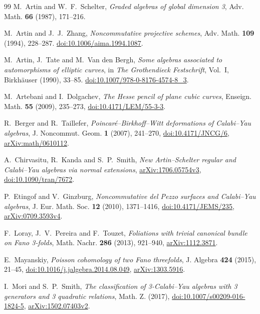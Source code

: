 \documentclass[11pt,a4paper]{ltjsarticle}
\numberwithin{equation}{section}
\begin{document}
\begin{thebibliography}{99}
M.~Artin and W.~F.~Schelter,
\textit{Graded algebras of global dimension 3},
Adv. Math. \textbf{66} (1987), 171--216.

M.~Artin and J.~J.~Zhang,
\textit{Noncommutative projective schemes},
Adv. Math. \textbf{109} (1994), 228--287.
\href{https://doi.org/10.1006/aima.1994.1087}{doi:10.1006/aima.1994.1087}.

M.~Artin, J.~Tate and M.~Van den Bergh,
\textit{Some algebras associated to automorphisms of elliptic curves},
in \textit{The Grothendieck Festschrift}, Vol.~I,
Birkh\"auser (1990), 33--85.
\href{https://doi.org/10.1007/978-0-8176-4574-8_3}{doi:10.1007/978-0-8176-4574-8\_3}.

M.~Artebani and I.~Dolgachev,
\textit{The Hesse pencil of plane cubic curves},
Enseign. Math. \textbf{55} (2009), 235--273,
\href{https://doi.org/10.4171/LEM/55-3-3}{doi:10.4171/LEM/55-3-3}.

R.~Berger and R.~Taillefer,
\textit{Poincar\'e--Birkhoff--Witt deformations of Calabi--Yau algebras},
J. Noncommut. Geom. \textbf{1} (2007), 241--270,
\href{https://doi.org/10.4171/JNCG/6}{doi:10.4171/JNCG/6},
\href{https://arxiv.org/abs/math/0610112}{arXiv:math/0610112}.

A.~Chirvasitu, R.~Kanda and S.~P.~Smith,
\textit{New Artin--Schelter regular and Calabi--Yau algebras via normal extensions},
\href{https://arxiv.org/abs/1706.05754}{arXiv:1706.05754v3},
\href{https://doi.org/10.1090/tran/7672}{doi:10.1090/tran/7672}.

P.~Etingof and V.~Ginzburg,
\textit{Noncommutative del Pezzo surfaces and Calabi--Yau algebras},
J. Eur. Math. Soc. \textbf{12} (2010), 1371--1416,
\href{https://doi.org/10.4171/JEMS/235}{doi:10.4171/JEMS/235},
\href{https://arxiv.org/abs/0709.3593}{arXiv:0709.3593v4}.

F.~Loray, J.~V.~Pereira and F.~Touzet,
\textit{Foliations with trivial canonical bundle on Fano 3-folds},
Math. Nachr. \textbf{286} (2013), 921--940,
\href{https://arxiv.org/abs/1112.3871}{arXiv:1112.3871}.

E.~Mayanskiy,
\textit{Poisson cohomology of two Fano threefolds},
J. Algebra \textbf{424} (2015), 21--45,
\href{https://doi.org/10.1016/j.jalgebra.2014.08.049}{doi:10.1016/j.jalgebra.2014.08.049},
\href{https://arxiv.org/abs/1303.5916}{arXiv:1303.5916}.

I.~Mori and S.~P.~Smith,
\textit{The classification of 3-Calabi--Yau algebras with 3 generators and 3 quadratic relations},
Math. Z. (2017),
\href{https://doi.org/10.1007/s00209-016-1824-5}{doi:10.1007/s00209-016-1824-5},
\href{https://arxiv.org/abs/1502.07403}{arXiv:1502.07403v2}.


\end{thebibliography}
\end{document}
